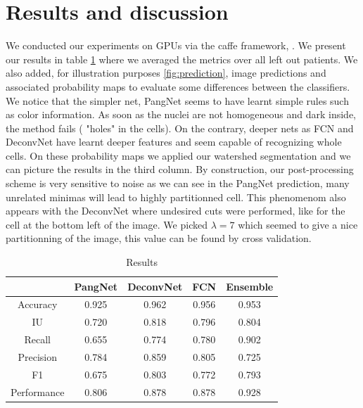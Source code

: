 \documentclass{article}
\begin{document}
\section{Results and discussion}
\label{sec:result}
\noindent We conducted our experiments on GPUs via the caffe framework, 
\cite{jia2014caffe}. We present our results in table \ref{tab:res} where 
we averaged the metrics over all left out patients. We also added, for 
illustration purposes \ref{fig:prediction}, image predictions and 
associated 
probability maps to evaluate some differences between the classifiers. 
We notice that the simpler net, PangNet seems to have learnt simple 
rules such as color information. As soon as the nuclei are not
homogeneous and dark inside, the method fails ( "holes" in the
cells). On the 
contrary, deeper nets as FCN and DeconvNet have learnt deeper features 
and seem capable of recognizing whole cells. On these probability maps 
we applied our watershed segmentation and we can picture the results in 
the third 
column. By construction, our post-processing 
scheme is very sensitive to noise as we can see in the PangNet 
prediction, many unrelated minimas will lead to highly partitionned cell. 
This phenomenom also appears with the DeconvNet where undesired 
cuts were performed, like for the cell at the bottom left of the image. 
We picked $\lambda = 7$ which seemed to give a nice partitionning of 
the image, this value can be found by cross validation.
\begin{table}
\begin{tabular}{|c|c|c|c|c|}
\hline
  & PangNet & DeconvNet & FCN & Ensemble\\
 \hline
Accuracy  &  0.925 & 0.962 &0.956 & 0.953  \\
IU   &    0.720 &  0.818 & 0.796 & 0.804 \\
Recall     &  0.655  & 0.774 & 0.780 & 0.902 \\
Precision   &  0.784 &     0.859 & 0.805 & 0.725\\
F1    &       0.675 &     0.803 & 0.772  & 0.793\\
Performance    &   0.806   & 0.878 &     0.878 & 0.928 \\
\hline
\end{tabular}
\caption{Results}
\label{tab:res}
\end{table}
\end{document}
